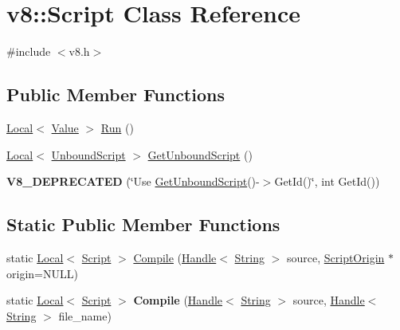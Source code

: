 \hypertarget{classv8_1_1Script}{}\section{v8\+:\+:Script Class Reference}
\label{classv8_1_1Script}


{\ttfamily \#include $<$v8.\+h$>$}

\subsection*{Public Member Functions}
\begin{DoxyCompactItemize}
\item 
\hyperlink{classv8_1_1Local}{Local}$<$ \hyperlink{classv8_1_1Value}{Value} $>$ \hyperlink{classv8_1_1Script_a5f43b29d40bd51ebad2cc275ba3898a1}{Run} ()
\item 
\hyperlink{classv8_1_1Local}{Local}$<$ \hyperlink{classv8_1_1UnboundScript}{Unbound\+Script} $>$ \hyperlink{classv8_1_1Script_afac25cad452a61897c375c2b881e2070}{Get\+Unbound\+Script} ()
\item 
\hypertarget{classv8_1_1Script_a0b781b6966adf4beb558eea17bfd998c}{}{\bfseries V8\+\_\+\+D\+E\+P\+R\+E\+C\+A\+T\+E\+D} (\char`\"{}Use \hyperlink{classv8_1_1Script_afac25cad452a61897c375c2b881e2070}{Get\+Unbound\+Script}()-\/$>$Get\+Id()\char`\"{}, int Get\+Id())\label{classv8_1_1Script_a0b781b6966adf4beb558eea17bfd998c}

\end{DoxyCompactItemize}
\subsection*{Static Public Member Functions}
\begin{DoxyCompactItemize}
\item 
static \hyperlink{classv8_1_1Local}{Local}$<$ \hyperlink{classv8_1_1Script}{Script} $>$ \hyperlink{classv8_1_1Script_a78500f4a95d75ffd0253f72a6db750b0}{Compile} (\hyperlink{classv8_1_1Handle}{Handle}$<$ \hyperlink{classv8_1_1String}{String} $>$ source, \hyperlink{classv8_1_1ScriptOrigin}{Script\+Origin} $\ast$origin=N\+U\+L\+L)
\item 
\hypertarget{classv8_1_1Script_ae420c65d6315f3ef8e83e79c17231f4e}{}static \hyperlink{classv8_1_1Local}{Local}$<$ \hyperlink{classv8_1_1Script}{Script} $>$ {\bfseries Compile} (\hyperlink{classv8_1_1Handle}{Handle}$<$ \hyperlink{classv8_1_1String}{String} $>$ source, \hyperlink{classv8_1_1Handle}{Handle}$<$ \hyperlink{classv8_1_1String}{String} $>$ file\+\_\+name)\label{classv8_1_1Script_ae420c65d6315f3ef8e83e79c17231f4e}

\end{DoxyCompactItemize}


